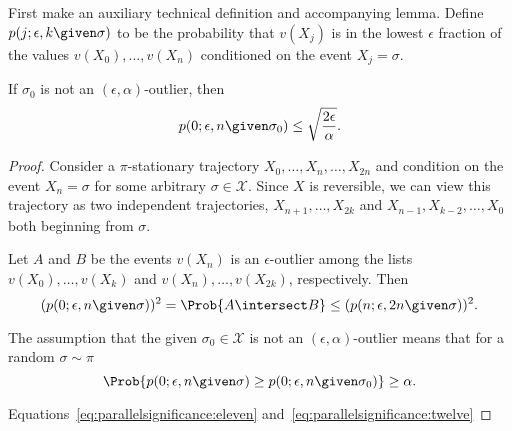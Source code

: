 \documentclass[12pt]{article}
\begin{document}
First make an auxiliary technical definition and accompanying lemma.
Define \( p(j; \epsilon,k \given \sigma) \) to be the probability that
\( v(X_j) \) is in the lowest \( \epsilon \) fraction of the values \(
v(X_0), \dots, v(X_n) \) conditioned on the event \( X_j = \sigma
\).

\begin{lemma}
     If \( \sigma_0 \) is not an \( (\epsilon,\alpha) \)-outlier, then
     \begin{equation}
     \label{eq:parallelsignificance:nine} p(0; \epsilon, n \given
     \sigma_0) \le \sqrt{\frac{2 \epsilon}{\alpha}}.
     \end{equation}
\end{lemma}

\begin{proof}
          \item
            Consider a \( \pi \)-stationary
            trajectory \( X_0, \dots, X_n, \dots, X_{2n} \) and
            condition on the event \( X_n = \sigma \) for some
            arbitrary \( \sigma \in \mathcal{X} \).  Since \( X \) is
            reversible, we can view this trajectory as two independent
            trajectories, \( X_{n+1}, \dots, X_{2k} \) and \( X_{n-1}, X_
            {k-2}, \dots, X_0 \) both beginning from \( \sigma \).
        \item
            Let \( A \) and \( B \) be the events \( v(X_n) \) is
            an \( \epsilon \)-outlier among the lists \( v(X_0), \dots,
            v(X_k) \) and \( v(X_n), \dots, v(X_{2k}) \), respectively.
            Then
            \begin{equation}
                \label{eq:parallelsignificance:eleven} (p(0; \epsilon, n \given
                \sigma))^2 = \Prob{ A \intersect B} \le (p(n; \epsilon,
                2n \given \sigma))^2.
            \end{equation}
        \item
            The assumption that the given \( \sigma_0 \in \mathcal{X} \)
            is not an \( (\epsilon, \alpha) \)-outlier means that for a
            random \( \sigma \sim \pi \)
            \begin{equation}
                \label{eq:parallelsignificance:twelve} \Prob{ p(0; \epsilon, n
                \given \sigma) \ge p(0; \epsilon, n \given \sigma_0) }
                \ge \alpha.
            \end{equation}
        \item
            Equations~\eqref{eq:parallelsignificance:eleven} and~\eqref{eq:parallelsignificance:twelve}

\end{proof}
\end{document}
